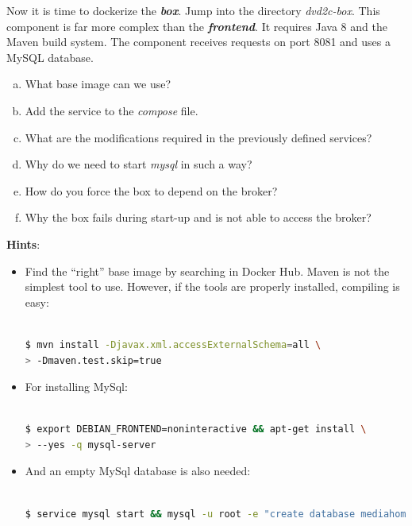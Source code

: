 \documentclass[a4paper,11pt]{exam}
\begin{document}
\begin{questions}
	\question Now it is time to dockerize the \textit{\textbf{box}}. Jump into the directory \textit{dvd2c-box}. This component is far more complex than the \textit{\textbf{frontend}}. It requires Java 8 and the Maven build system. The component receives requests on port 8081 and uses a MySQL database.
	
	\begin{enumerate}[(a)] %
		\item What base image can we use?
		\item Add the service to the \textit{compose} file.
		\item What are the modifications required in the previously defined services?
		\item Why do we need to start \textit{mysql} in such a way?
		\item How do you force the box to depend on the broker?
		\item Why the box fails during start-up and is not able to access the broker?
	\end{enumerate}
	
	\textbf{Hints}:
	\begin{itemize}
		\item Find the ``right'' base image by searching in Docker Hub. Maven is not the simplest tool to use. However, if the tools are properly installed, compiling is easy:

\begin{lstlisting}[frame=single,language={sh}] %

$ mvn install -Djavax.xml.accessExternalSchema=all \
> -Dmaven.test.skip=true
\end{lstlisting}

		\item For installing MySql:
		
\begin{lstlisting}[frame=single,language={sh}] %

$ export DEBIAN_FRONTEND=noninteractive && apt-get install \
> --yes -q mysql-server
\end{lstlisting}

		\item And an empty MySql database is also needed:

\begin{lstlisting}[frame=single,language={sh}] %	
	
$ service mysql start && mysql -u root -e "create database mediahome;" 
\end{lstlisting}


\end{itemize}
\end{questions}
\end{document}
